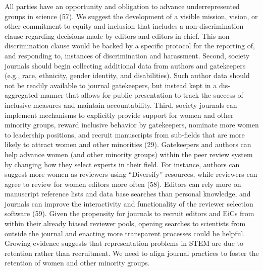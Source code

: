 \documentclass[11pt,]{article}
\begin{document}
All parties have an opportunity and obligation to advance
underrepresented groups in science (57). We suggest the development of a
visible mission, vision, or other commitment to equity and inclusion
that includes a non-discrimination clause regarding decisions made by
editors and editors-in-chief. This non-discrimination clause would be
backed by a specific protocol for the reporting of, and responding to,
instances of discrimination and harassment. Second, society journals
should begin collecting additional data from authors and gatekeepers
(e.g., race, ethnicity, gender identity, and disabilities). Such author
data should not be readily available to journal gatekeepers, but instead
kept in a dis-aggregated manner that allows for public presentation to
track the success of inclusive measures and maintain accountability.
Third, society journals can implement mechanisms to explicitly provide
support for women and other minority groups, reward inclusive behavior
by gatekeepers, nominate more women to leadership positions, and recruit
manuscripts from sub-fields that are more likely to attract women and
other minorities (29). Gatekeepers and authors can help advance women
(and other minority groups) within the peer review system by changing
how they select experts in their field. For instance, authors can
suggest more women as reviewers using ``Diversify'' resources, while
reviewers can agree to review for women editors more often (58). Editors
can rely more on manuscript reference lists and data base searches than
personal knowledge, and journals can improve the interactivity and
functionality of the reviewer selection software (59). Given the
propensity for journals to recruit editors and EiCs from within their
already biased reviewer pools, opening searches to scientists from
outside the journal and enacting more transparent processes could be
helpful. Growing evidence suggests that representation problems in STEM
are due to retention rather than recruitment. We need to align journal
practices to foster the retention of women and other minority groups.
\end{document}
